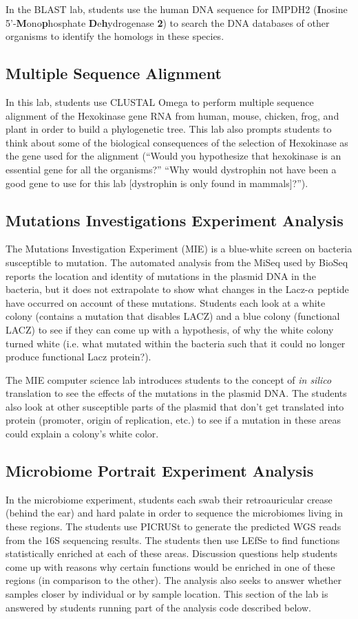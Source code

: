 \documentclass{report}
\begin{document}
In the BLAST lab, students use the human DNA sequence for IMPDH2 (\textbf{I}nosine 5'-\textbf{M}ono\textbf{p}hosphate \textbf{D}e\textbf{h}ydrogenase \textbf{2}) to search the DNA databases of other organisms to identify the homologs in these species.

\subsection{Multiple Sequence Alignment}
In this lab, students use CLUSTAL Omega to perform multiple sequence alignment of the Hexokinase gene RNA from human, mouse, chicken, frog, and plant in order to build a phylogenetic tree. This lab also prompts students to think about some of the biological consequences of the selection of Hexokinase as the gene used for the alignment (``Would you hypothesize that hexokinase is an essential gene for all the organisms?'' ``Why would dystrophin not have been a good gene to use for this lab [dystrophin is only found in mammals]?'').


\subsection{Mutations Investigations Experiment Analysis}
The Mutations Investigation Experiment (MIE) is a blue-white screen on bacteria susceptible to mutation. The automated analysis from the MiSeq used by BioSeq reports the location and identity of mutations in the plasmid DNA in the bacteria, but it does not extrapolate to show what changes in the Lacz-$\alpha$ peptide have occurred on account of these mutations. Students each look at a white colony (contains a mutation that disables LACZ) and a blue colony (functional LACZ) to see if they can come up with a hypothesis, of why the white colony turned white (i.e. what mutated within the bacteria such that it could no longer produce functional Lacz protein?).

The MIE computer science lab introduces students to the concept of \emph{in silico} translation to see the effects of the mutations in the plasmid DNA. The students also look at other susceptible parts of the plasmid that don't get translated into protein (promoter, origin of replication, etc.) to see if a mutation in these areas could explain a colony's white color.

\subsection{Microbiome Portrait Experiment Analysis}
In the microbiome experiment, students each swab their retroauricular crease (behind the ear) and hard palate in order to sequence the microbiomes living in these regions. The students use PICRUSt to generate the predicted WGS reads from the 16S sequencing results. The students then use LEfSe to find functions statistically enriched at each of these areas. Discussion questions help students come up with reasons why certain functions would be enriched in one of these regions (in comparison to the other). The analysis also seeks to answer whether samples closer by individual or by sample location. This section of the lab is answered by students running part of the analysis code described below.
\end{document}
